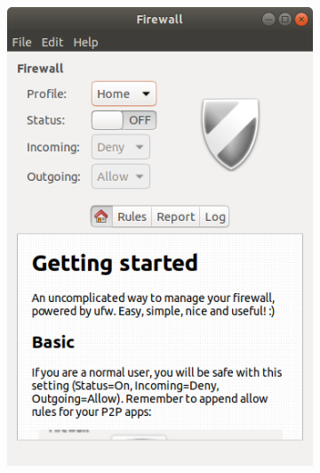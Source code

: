 \documentclass[
	a4paper,
	oneside,
	BCOR = 10mm,
	DIV = 12,
	12pt,
	headings = normal,
]{scrartcl}
\newlength{\gridunitwidth}
\begin{document}
		\begin{figure}[!htbp]
			\begin{subfigure}[b]{3 \gridunitwidth - 1em / 4}
				\includegraphics[width = \columnwidth]{./assets/01.png}
				\caption{}
				\label{subfig:01-01}
			\end{subfigure}%
			\hspace{0.333333em}%
			\begin{subfigure}[b]{3 \gridunitwidth - 1em / 4}

\end{subfigure}
\end{figure}
\end{document}
